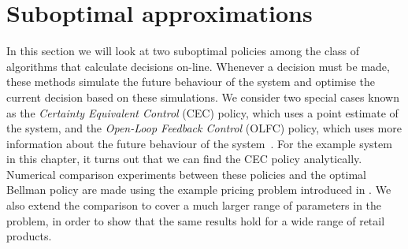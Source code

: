 \documentclass[main.tex]{subfiles}
\begin{document}
\section{Suboptimal
  approximations}\label{sec:suboptimal_approximations}
In this section we will look at two suboptimal policies among the class of
algorithms that calculate decisions on-line.
Whenever a decision must be made, these methods simulate the future
behaviour of the system and optimise the current decision based on
these simulations.
We consider two special cases known as the
\emph{Certainty Equivalent Control} (CEC) policy, which uses a point
estimate of the system, and
the \emph{Open-Loop Feedback Control} (OLFC) policy, which uses more
information about the  future behaviour of the system~\citep[Ch.~6]{bertsekas2005dynamic}.
For the example system in this chapter, it turns out that we can find
the CEC policy analytically.
Numerical comparison experiments between these policies and the optimal
Bellman policy are
made using the example pricing problem introduced in
. We also extend the comparison to
cover a much larger range of parameters in the problem, in order to show that
the same results hold for a wide range of retail products.
\end{document}
